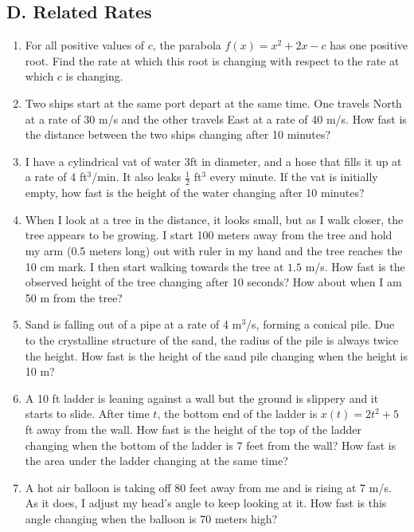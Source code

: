 \documentclass{article}
\begin{document}
\subsection*{D. Related Rates}

\begin{enumerate}
\item For all positive values of $c$, the parabola $f(x)=x^2+2x-c$ has one positive root. Find the rate at which this root is changing with respect to the rate at which $c$ is changing.
\item Two ships start at the same port depart at the same time. One travels North at a rate of 30 m/s and the other travels East at a rate of 40 m/s. How fast is the distance between the two ships changing after 10 minutes?
\item I have a cylindrical vat of water 3ft in diameter, and a hose that fills it up at a rate of 4 ft$^3$/min. It also leaks $\frac{1}{2}$ ft$^3$ every minute. If the vat is initially empty, how fast is the height of the water changing after 10 minutes?
\item When I look at a tree in the distance, it looks small, but as I walk closer, the tree appears to be growing. I start 100 meters away from the tree and hold my arm (0.5 meters long) out with ruler in my hand and the tree reaches the 10 cm mark. I then start walking towards the tree at $1.5$ m/s. How fast is the observed height of the tree changing after 10 seconds? How about when I am 50 m from the tree?
\item Sand is falling out of a pipe at a rate of 4 m$^3$/s, forming a conical pile. Due to the crystalline structure of the sand, the radius of the pile is always twice the height. How fast is the height of the sand pile changing when the height is 10 m?
\item A 10 ft ladder is leaning against a wall but the ground is slippery and it starts to slide. After time $t$, the bottom end of the ladder is $x(t)=2t^2 + 5$ ft away from the wall. How fast is the height of the top of the ladder changing when the bottom of the ladder is 7 feet from the wall? How fast is the area under the ladder changing at the same time?
\item A hot air balloon is taking off 80 feet away from me and is rising at 7 m/s. As it does, I adjust my head's angle to keep looking at it. How fast is this angle changing when the balloon is 70 meters high?

\end{enumerate}
\end{document}
